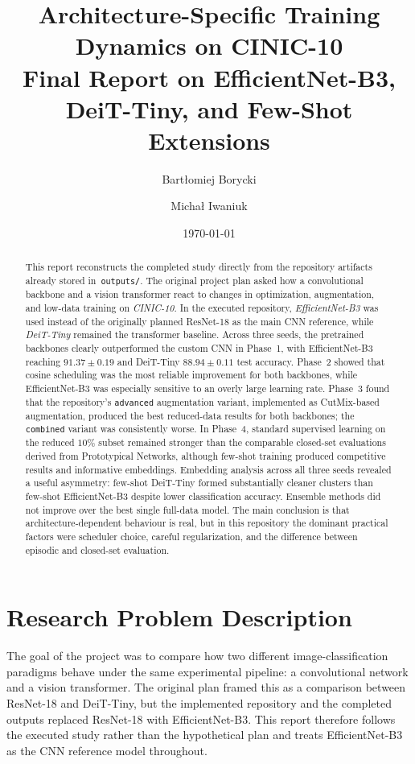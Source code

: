 \documentclass[12pt,a4paper]{article}
\title{Architecture-Specific Training Dynamics on CINIC-10\\Final Report on EfficientNet-B3, DeiT-Tiny, and Few-Shot Extensions}
\author{Bart\l{}omiej Borycki \and Micha\l{} Iwaniuk}
\date{\today}
\begin{document}
\maketitle

\begin{abstract}
This report reconstructs the completed study directly from the repository artifacts already stored in~\texttt{outputs/}. The original project plan asked how a convolutional backbone and a vision transformer react to changes in optimization, augmentation, and low-data training on \emph{CINIC-10}. In the executed repository, \emph{EfficientNet-B3} was used instead of the originally planned ResNet-18 as the main CNN reference, while \emph{DeiT-Tiny} remained the transformer baseline. Across three seeds, the pretrained backbones clearly outperformed the custom CNN in Phase~1, with EfficientNet-B3 reaching $91.37 \pm 0.19$ and DeiT-Tiny $88.94 \pm 0.11$ test accuracy. Phase~2 showed that cosine scheduling was the most reliable improvement for both backbones, while EfficientNet-B3 was especially sensitive to an overly large learning rate. Phase~3 found that the repository's \texttt{advanced} augmentation variant, implemented as CutMix-based augmentation, produced the best reduced-data results for both backbones; the \texttt{combined} variant was consistently worse. In Phase~4, standard supervised learning on the reduced $10\%$ subset remained stronger than the comparable closed-set evaluations derived from Prototypical Networks, although few-shot training produced competitive results and informative embeddings. Embedding analysis across all three seeds revealed a useful asymmetry: few-shot DeiT-Tiny formed substantially cleaner clusters than few-shot EfficientNet-B3 despite lower classification accuracy. Ensemble methods did not improve over the best single full-data model. The main conclusion is that architecture-dependent behaviour is real, but in this repository the dominant practical factors were scheduler choice, careful regularization, and the difference between episodic and closed-set evaluation.
\end{abstract}

\section{Research Problem Description}
\label{sec:problem}

The goal of the project was to compare how two different image-classification paradigms behave under the same experimental pipeline: a convolutional network and a vision transformer. The original plan framed this as a comparison between ResNet-18 and DeiT-Tiny, but the implemented repository and the completed outputs replaced ResNet-18 with EfficientNet-B3. This report therefore follows the executed study rather than the hypothetical plan and treats EfficientNet-B3 as the CNN reference model throughout.
\end{document}
